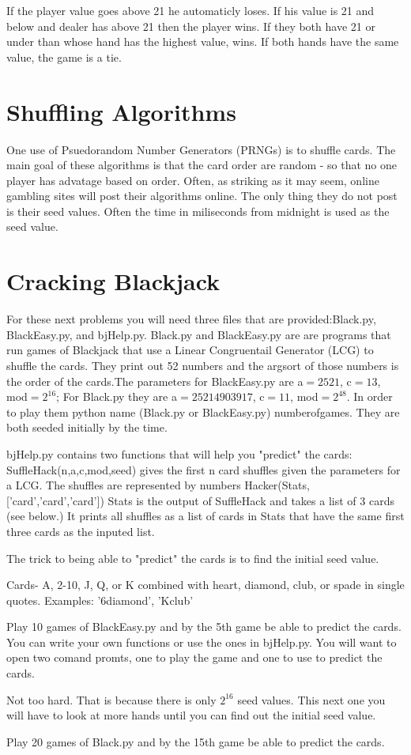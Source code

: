 If the player value goes above 21 he automaticly loses. If his value is 21 and below and dealer has above 21 then the player wins. If they both have 21 or under than whose hand has the highest value, wins. If both hands have the same value, the game is a tie.

\section*{Shuffling Algorithms}

One use of Psuedorandom Number Generators (PRNGs) is to shuffle cards. The main goal of these algorithms is that the card order are random - so that no one player has advatage based on order. Often, as striking as it may seem, online gambling sites will post their algorithms online. The only thing they do not post is their seed values. Often the time in miliseconds from midnight is used as the seed value.

\section*{Cracking Blackjack}
For these next problems you will need three files that are provided:Black.py, BlackEasy.py, and bjHelp.py.  Black.py and BlackEasy.py are are programs that run games of Blackjack that use a Linear Congruentail Generator (LCG) to shuffle the cards. They print out 52 numbers and the argsort of those numbers is the order of the cards.The parameters for BlackEasy.py are a$=2521$, c$=13$, mod$=2^{16}$; For Black.py they are a$=25214903917$, c$=11$, mod$=2^{48}$. In order to play them python name (Black.py or BlackEasy.py) numberofgames. They are both seeded initially by the time.

bjHelp.py contains two functions that will help you "predict" the cards:
SuffleHack(n,a,c,mod,seed) gives the first n card shuffles given the parameters for a LCG. The shuffles are represented by numbers 
Hacker(Stats,['card','card','card']) Stats is the output of SuffleHack and takes a list of 3 cards (see below.) It prints all shuffles as a list of cards in Stats that have the same first three cards as the inputed list.

The trick to being able to "predict" the cards is to find the initial seed value.

Cards- A, 2-10, J, Q, or K combined with heart, diamond, club, or spade in single quotes. Examples: '6diamond', 'Kclub'



\begin{problem}
Play 10 games of BlackEasy.py and by the 5th game be able to predict the cards. You can write your own functions or use the ones in bjHelp.py. You will want to open two comand promts, one to play the game and one to use to predict the cards. 
\end{problem}

Not too hard. That is because there is only $2^{16}$ seed values. This next one you will have to look at more hands until you can find out the initial seed value.

\begin{problem}
Play 20 games of Black.py and by the 15th game be able to predict the cards.
\end{problem}



